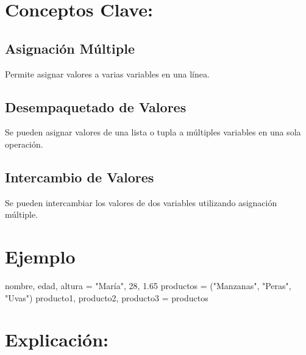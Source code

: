 \documentclass[
  a4paper,
  onepage,
  openany]{scrreprt}
\newenvironment{Shaded}{\begin{snugshade}}{\end{snugshade}}
\newcommand{\DecValTok}[1]{\textcolor[rgb]{0.68,0.00,0.00}{#1}}
\newcommand{\FloatTok}[1]{\textcolor[rgb]{0.68,0.00,0.00}{#1}}
\newcommand{\NormalTok}[1]{\textcolor[rgb]{0.00,0.23,0.31}{#1}}
\newcommand{\OperatorTok}[1]{\textcolor[rgb]{0.37,0.37,0.37}{#1}}
\newcommand{\StringTok}[1]{\textcolor[rgb]{0.13,0.47,0.30}{#1}}
\begin{document}
\hypertarget{conceptos-clave-12}{%
\section{Conceptos Clave:}\label{conceptos-clave-12}}

\hypertarget{asignaciuxf3n-muxfaltiple}{%
\subsection{Asignación Múltiple}\label{asignaciuxf3n-muxfaltiple}}

Permite asignar valores a varias variables en una línea.

\hypertarget{desempaquetado-de-valores}{%
\subsection{Desempaquetado de Valores}\label{desempaquetado-de-valores}}

Se pueden asignar valores de una lista o tupla a múltiples variables en
una sola operación.

\hypertarget{intercambio-de-valores}{%
\subsection{Intercambio de Valores}\label{intercambio-de-valores}}

Se pueden intercambiar los valores de dos variables utilizando
asignación múltiple.

\hypertarget{ejemplo-12}{%
\section{Ejemplo}\label{ejemplo-12}}

\begin{Shaded}
\begin{Highlighting}[]
\NormalTok{nombre, edad, altura }\OperatorTok{=} \StringTok{"María"}\NormalTok{, }\DecValTok{28}\NormalTok{, }\FloatTok{1.65}
\NormalTok{productos }\OperatorTok{=}\NormalTok{ (}\StringTok{"Manzanas"}\NormalTok{, }\StringTok{"Peras"}\NormalTok{, }\StringTok{"Uvas"}\NormalTok{)}
\NormalTok{producto1, producto2, producto3 }\OperatorTok{=}\NormalTok{ productos}
\end{Highlighting}
\end{Shaded}

\hypertarget{explicaciuxf3n-12}{%
\section{Explicación:}\label{explicaciuxf3n-12}}
\end{document}
